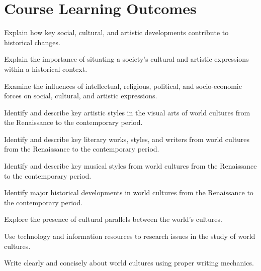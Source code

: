 \documentclass{article}
\begin{document}
\section*{Course Learning Outcomes}
\begin{enumerate*}
	\item Explain how key social, cultural, and artistic developments contribute to historical changes.
	\item Explain the importance of situating a society's cultural and artistic expressions within a historical context.
	\item Examine the influences of intellectual, religious, political, and socio-economic forces on social, cultural, and artistic expressions.
	\item Identify and describe key artistic styles in the visual arts of world cultures from the Renaissance to the contemporary period.
	\item Identify and describe key literary works, styles, and writers from world cultures from the Renaissance to the contemporary period.
	\item Identify and describe key musical styles from world cultures from the Renaissance to the contemporary period.
	\item Identify major historical developments in world cultures from the Renaissance to the contemporary period.
	\item Explore the presence of cultural parallels between the world's cultures.
	\item Use technology and information resources to research issues in the study of world cultures.
	\item Write clearly and concisely about world cultures using proper writing mechanics.
\end{enumerate*}











\end{document}
